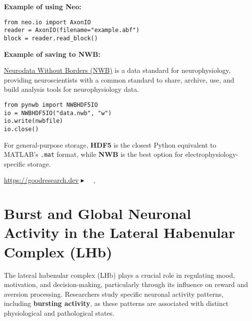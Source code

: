 \documentclass[a4paper,9pt]{extarticle}
\newcommand{\fcite}[1]{{{\noindent\footnotesize$\blacktriangleright$\ }\color{ColorCite} \citeauthor{#1}~\citeyear{#1}, \citetitle{#1}~\cite{#1}}}
\begin{document}
\begin{multicols}{2}
\textbf{Example of using Neo:}

\begin{lstlisting}
from neo.io import AxonIO
reader = AxonIO(filename="example.abf")
block = reader.read_block()
\end{lstlisting}

\textbf{Example of saving to NWB:}

\href{https://www.nwb.org}{Neurodata Without Borders (NWB)} is a data standard for neurophysiology, providing neuroscientists with a common standard to share, archive, use, and build analysis tools for neurophysiology data. 

\begin{lstlisting}
from pynwb import NWBHDF5IO
io = NWBHDF5IO("data.nwb", "w")
io.write(nwbfile)
io.close()
\end{lstlisting}

For general-purpose storage, \textbf{HDF5} is the closest Python equivalent to MATLAB's \texttt{.mat} format, while \textbf{NWB} is the best option for electrophysiology-specific storage.




\end{multicols}


\clearpage


\cite{kass2023a} 


\url{https://goodresearch.dev} \fcite{mineault2021a}

\section{Burst and Global Neuronal Activity in the Lateral Habenular Complex (LHb)}

The lateral habenular complex (LHb) plays a crucial role in regulating mood, motivation, and decision-making, particularly through its influence on reward and aversion processing. Researchers study specific neuronal activity patterns, including \textbf{bursting activity}, as these patterns are associated with distinct physiological and pathological states.
\end{document}
